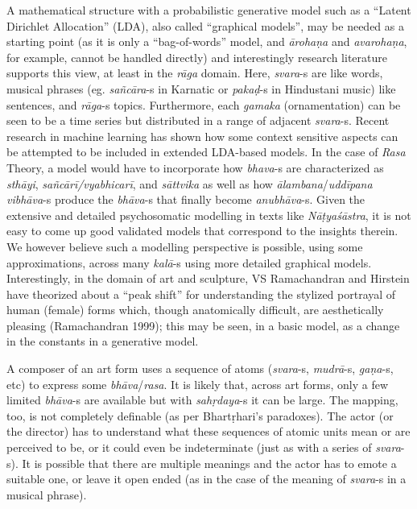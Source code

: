A mathematical structure with a probabilistic generative model such as a “Latent Dirichlet Allocation” (LDA), also called “graphical models”, may be needed as a starting point (as it is only a “bag-of-words” model, and \textsl{ārohaṇa} and \textsl{avarohaṇa}, for example, cannot be handled directly) and interestingly research literature supports this view, at least in the \textsl{rāga} domain. Here, \textsl{svara}-s are like words, musical phrases (eg. \textsl{sañcāra}-s in Karnatic or \textsl{pakaḍ}-s in Hindustani music) like sentences, and \textsl{rāga}-s topics. Furthermore, each \textsl{gamaka} (ornamentation) can be seen to be a time series but distributed in a range of adjacent \textsl{svara}-s. Recent research in machine learning has shown how some context sensitive aspects can be attempted to be included in extended LDA-based models. In the case of \textsl{Rasa} Theory, a model would have to incorporate how \textsl{bhava}-s are characterized as \textsl{sthāyi}, \textsl{sañcārī/vyabhicarī}, and \textsl{sāttvika} as well as how \textsl{ālambana}/\textsl{uddīpana vibhāva}-s produce the \textsl{bhāva}-s that finally become \textsl{anubhāva}-s. Given the extensive and detailed psychosomatic modelling in texts like \textsl{Nāṭyaśāstra}, it is not easy to come up good validated models that correspond to the insights therein. We however believe such a modelling perspective is possible, using some approximations, across many \textsl{kalā}-s using more detailed graphical models. Interestingly, in the domain of art and sculpture, VS Ramachandran and Hirstein have theorized about a “peak shift” for understanding the stylized portrayal of human (female) forms which, though anatomically difficult, are aesthetically pleasing (Ramachandran 1999); this may be seen, in a basic model, as a change in the constants in a generative model.

A composer of an art form uses a sequence of atoms (\textsl{svara}-s, \textsl{mudrā}-s, \textsl{gaṇa}-s, etc) to express some \textsl{bhāva}/\textsl{rasa}. It is likely that, across art forms, only a few limited \textsl{bhāva}-s are available but with \textsl{sahṛdaya}-s it can be large. The mapping, too, is not completely definable (as per Bhartṛhari’s paradoxes). The actor (or the director) has to understand what these sequences of atomic units mean or are perceived to be, or it could even be indeterminate (just as with a series of \textsl{svara}-s). It is possible that there are multiple meanings and the actor has to emote a suitable one, or leave it open ended (as in the case of the meaning of \textsl{svara}-s in a musical phrase).

